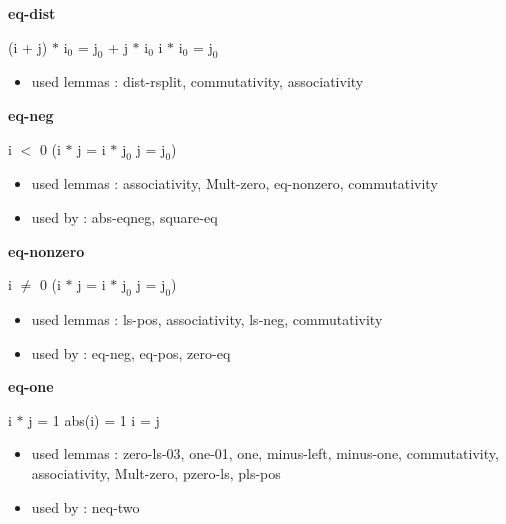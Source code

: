 \documentclass[a4paper]{article}
\begin{document}
\medskip

\bigskip

{\large\bf eq-dist}

\medskip

 \Fol (i + j) $*$ $\mbox{i}_{0}$ = $\mbox{j}_{0}$ + j $*$ $\mbox{i}_{0}$ \Equiv i $*$ $\mbox{i}_{0}$ = $\mbox{j}_{0}$

\begin{itemize}


\item       used lemmas  : dist-rsplit, commutativity, associativity

\end{itemize}

\medskip

\bigskip

{\large\bf eq-neg}

\medskip

 \Fol i $<$ 0 \Imp (i $*$ j = i $*$ $\mbox{j}_{0}$ \Equiv j = $\mbox{j}_{0}$)

\begin{itemize}


\item       used lemmas  : associativity, Mult-zero, eq-nonzero, commutativity
\item       used by      : abs-eqneg, square-eq

\end{itemize}

\medskip

\bigskip

{\large\bf eq-nonzero}

\medskip

 \Fol i $\neq$ 0 \Imp (i $*$ j = i $*$ $\mbox{j}_{0}$ \Equiv j = $\mbox{j}_{0}$)

\begin{itemize}


\item       used lemmas  : ls-pos, associativity, ls-neg, commutativity
\item       used by      : eq-neg, eq-pos, zero-eq

\end{itemize}

\medskip

\bigskip

{\large\bf eq-one}

\medskip

 \Fol i $*$ j = 1 \Equiv abs(i) = 1 \And i = j

\begin{itemize}


\item       used lemmas  : zero-ls-03, one-01, one, minus-left, minus-one, commutativity, associativity, Mult-zero, pzero-ls, pls-pos
\item       used by      : neq-two

\end{itemize}
\end{document}
